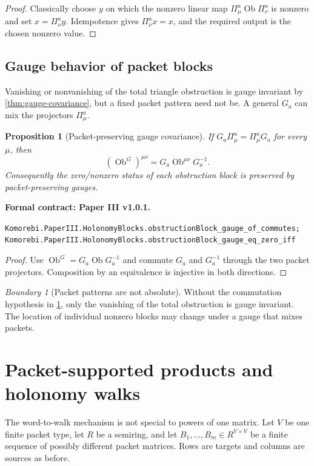 \documentclass[11pt,a4paper]{article}
\theoremstyle{plain}
\newtheorem{proposition}[proposition]{Proposition}
\theoremstyle{definition}
\theoremstyle{remark}
\newtheorem{boundary}[boundary]{Boundary}
\newcommand{\Ob}{\operatorname{Ob}}
\newcommand{\leanname}[1]{\nolinkurl{#1}}
\newcommand{\statusleanthree}[1]{\par\smallskip\noindent\begin{minipage}{\linewidth}{\color{leanblue}\textbf{Formal contract: Paper III v1.0.1.}}\par\begingroup\small\raggedright\leanname{#1}\par\endgroup\end{minipage}\par\smallskip}
\begin{document}
\begin{proof}
Classically choose $y$ on which the nonzero linear map
$\Pi^a_\mu\Ob\Pi^a_\nu$ is nonzero and set $x=\Pi^a_\nu y$.
Idempotence gives $\Pi^a_\nu x=x$, and the required output is the chosen
nonzero value.
\end{proof}

\subsection{Gauge behavior of packet blocks}

Vanishing or nonvanishing of the total triangle obstruction is gauge invariant
by \cref{thm:gauge-covariance}, but a fixed packet pattern need not be.  A
general $G_a$ can mix the projectors $\Pi^a_\mu$.

\begin{proposition}[Packet-preserving gauge covariance]
\label{prop:packet-gauge}
If $G_a\Pi^a_\mu=\Pi^a_\mu G_a$ for every $\mu$, then
\[
\left(\Ob^G\right)^{\mu\nu}
=
G_a\Ob^{\mu\nu}G_a^{-1}.
\]
Consequently the zero/nonzero status of each obstruction block is preserved
by packet-preserving gauges.
\end{proposition}
\statusleanthree{Komorebi.PaperIII.HolonomyBlocks.obstructionBlock_gauge_of_commutes; Komorebi.PaperIII.HolonomyBlocks.obstructionBlock_gauge_eq_zero_iff}

\begin{proof}
Use $\Ob^G=G_a\Ob G_a^{-1}$ and commute $G_a$ and $G_a^{-1}$ through the
two packet projectors.  Composition by an equivalence is injective in both
directions.
\end{proof}

\begin{boundary}[Packet patterns are not absolute]
Without the commutation hypothesis in \cref{prop:packet-gauge}, only the
vanishing of the total obstruction is gauge invariant.  The location of
individual nonzero blocks may change under a gauge that mixes packets.
\end{boundary}

\section{Packet-supported products and holonomy walks}
\label{sec:holonomy-walks}

The word-to-walk mechanism is not special to powers of one matrix.  Let $V$
be one finite packet type, let $R$ be a semiring, and let
$B_1,\ldots,B_m\in R^{V\times V}$ be a finite sequence of possibly different
packet matrices.  Rows are targets and columns are sources as before.
\end{document}
